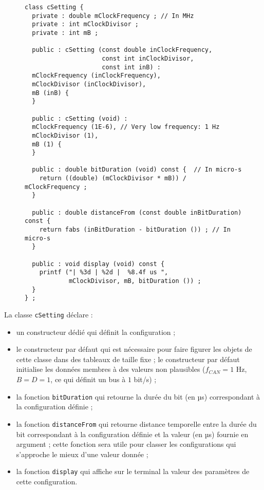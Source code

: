 \begin{figure}[!ht]
\begin{lstlisting}
class cSetting {
  private : double mClockFrequency ; // In MHz
  private : int mClockDivisor ;
  private : int mB ;
  
  public : cSetting (const double inClockFrequency,
                     const int inClockDivisor,
                     const int inB) :
  mClockFrequency (inClockFrequency),
  mClockDivisor (inClockDivisor),
  mB (inB) {
  }
  
  public : cSetting (void) :
  mClockFrequency (1E-6), // Very low frequency: 1 Hz
  mClockDivisor (1),
  mB (1) {
  }

  public : double bitDuration (void) const {  // In micro-s
    return ((double) (mClockDivisor * mB)) / mClockFrequency ;
  }

  public : double distanceFrom (const double inBitDuration) const {
    return fabs (inBitDuration - bitDuration ()) ; // In micro-s
  }

  public : void display (void) const {
    printf ("| %3d | %2d |  %8.4f us ",
            mClockDivisor, mB, bitDuration ()) ;
  }
} ;
\end{lstlisting}
\end{figure}

La classe \texttt{cSetting} déclare :
\begin{itemize}
\item un constructeur dédié qui définit la configuration ;
\item le constructeur par défaut qui est nécessaire pour faire figurer les objets de cette classe dans des tableaux de taille fixe ; le constructeur par défaut initialise les données membres à des valeurs non plausibles ($f_{CAN} = 1$ Hz, $B = D = 1$, ce qui définit un bus à $1$ bit/s)  ;
\item la fonction \texttt{bitDuration} qui retourne la durée du bit (en µs) correspondant à la configuration définie ;
\item la fonction \texttt{distanceFrom} qui retourne distance temporelle entre la durée du bit correspondant à la configuration définie et la valeur (en µs) fournie en argument ; cette fonction sera utile pour classer les configurations qui s'approche le mieux d'une valeur donnée ;
\item la fonction \texttt{display} qui affiche sur le terminal la valeur des paramètres de cette configuration.
\end{itemize}









